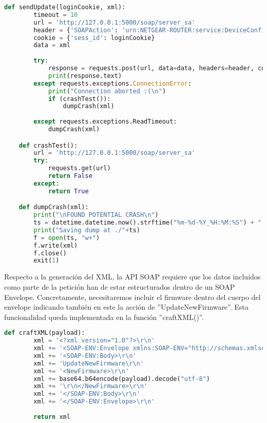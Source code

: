 \begin{lstlisting}[language=python, caption=Envío de actualización de firmware al servicio UPNP., captionpos=b,
    frame=single, breaklines, showstringspaces=false]
    def sendUpdate(loginCookie, xml):
        timeout = 10
        url = 'http://127.0.0.1:5000/soap/server_sa'
        header = {'SOAPAction': 'urn:NETGEAR-ROUTER:service:DeviceConfig:1#UpdateNewFirmware'}
        cookie = {'sess_id': loginCookie}
        data = xml
        
        try:
            response = requests.post(url, data=data, headers=header, cookies=cookie, timeout=timeout)
            print(response.text)
        except requests.exceptions.ConnectionError:
            print("Connection aborted :(\n")
            if (crashTest()):
                dumpCrash(xml)
                
        except requests.exceptions.ReadTimeout:
            dumpCrash(xml)

    def crashTest():
        url = 'http://127.0.0.1:5000/soap/server_sa'
        try:
            requests.get(url)
            return False
        except:
            return True

    def dumpCrash(xml):
        print("\nFOUND POTENTIAL CRASH\n")
        ts = datetime.datetime.now().strftime("%m-%d-%Y_%H:%M:%S") + ".dmp"
        print("Saving dump at ./"+ts)
        f = open(ts, "w+")
        f.write(xml)
        f.close()
        exit(1)
\end{lstlisting}

Respecto a la generación del XML, la API SOAP requiere que los datos incluidos como parte de la petición han de estar estructurados 
dentro de un SOAP Envelope. Concretamente, necesitaremos incluir el firmware dentro del cuerpo del envelope indicando también en este 
la acción de ''UpdateNewFirmware''. Esta funcionalidad queda implementada en la función ''craftXML()''.

\begin{lstlisting}[language=python, caption=Generación del XML envelope con el firmware para la actualización desde UPNP., captionpos=b,
    frame=single, breaklines, showstringspaces=false]
    def craftXML(payload):
        xml = '<?xml version="1.0"?>\r\n'
        xml += '<SOAP-ENV:Envelope xmlns:SOAP-ENV="http://schemas.xmlsoap.org/soap/envelope/" SOAP-ENV:encodingStyle="http://schemas.xmlsoap.$\r\n'
        xml += '<SOAP-ENV:Body>\r\n'
        xml += 'UpdateNewFirmware\r\n'
        xml += '<NewFirmware>\r\n'
        xml += base64.b64encode(payload).decode("utf-8")
        xml += '\r\n</NewFirmware>\r\n'
        xml += '</SOAP-ENV:Body>\r\n'
        xml += '</SOAP-ENV:Envelope>\r\n'
        
        return xml
\end{lstlisting}

